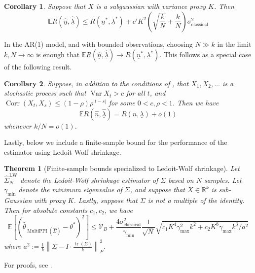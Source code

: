 \documentclass{article} %
\newcommand{\R}{\mathbb{R}}
\newcommand{\Ex}{\mathbb{E}}
\DeclareMathOperator{\Var}{Var}
\DeclareMathOperator{\multiPPI}{MultiPPI}
\DeclareMathOperator{\Corr}{Corr}
\DeclareMathOperator{\tr}{tr}
\newtheorem{theorem}{Theorem}
\newtheorem{corollary}[corollary]{Corollary}
\newcommand{\wh}[1]{\widehat{#1}}
\newcommand{\ul}[1]{\underline{#1}}
\DeclareMathOperator{\classical}{classical}
\begin{document}
\begin{corollary}\label{cor:subg}
    Suppose that $X$ is a subgaussian with variance proxy $K$. Then
    \[
    \Ex R(\wh{\ul{n}},\wh{\ul{\lambda}})\leq R(\ul{n}^*,\ul{\lambda}^*)+c' K^2\left(\sqrt{\frac{k}{N}}+\frac{k}{N}\right)\sigma^2_{\classical}
    \]
\end{corollary}

In the AR(1) model, and with bounded observations, choosing $N\gg k$ in the limit $k,N\to\infty$ is enough that $\mathbb{E}R(\wh{\ul{n}},\wh{\ul{\lambda}}) \to R({\ul{n}}^*,{\ul{\lambda}}^*)$. This follows as a special case of the following result.

\begin{corollary}\label{cor:gersch}
Suppose, in addition to the conditions of , that $X_1,X_2,\dots$ is a stochastic process such that $\Var X_t>c$ for all $t$, and $\Corr(X_t,X_s)\leq (1-\rho)\rho^{|t-s|}$ for some $0<c,\rho<1$. Then we have
\[
\Ex R(\wh{\ul{n}},\wh{\ul{\lambda}}) = R(\ul{n},\ul{\lambda}) +o(1)
\]
whenever $k/N = o(1)$.
\end{corollary}

Lastly, below we include a finite-sample bound for the performance of the estimator using Ledoit-Wolf shrinkage.
\begin{theorem}[Finite-sample bounds specialized to Ledoit-Wolf shrinkage]\label{thm:ledoit}
    Let $\widehat{\Sigma}_N^
    \text{LW}$ denote the Ledoit-Wolf shrinkage estimator of $\Sigma$ based on $N$ samples. Let $\gamma_{\min}$ denote the minimum eigenvalue of $\Sigma$, and suppose that $X\in \R^k$ is sub-Gaussian with proxy $K$. Lastly, suppose that $\Sigma$ is not a multiple of the identity. Then for absolute constants $c_1,c_2$, we have
    \[
    \Ex \left[\left(\hat{\theta}_{\multiPPI(\wh{\Sigma})}-\theta^*\right)^2\right] \leq \mathcal{V}_B+\frac{4\sigma^2_{\text{classical}}}{\gamma_{\min}} \frac{1}{\sqrt{N}}\sqrt{c_1K^4\gamma_{\max}^2 k^2 + c_2 K^8 \gamma_{\max} k^3/a^2}
    \]
    where $a^2:=\frac{1}{k}\left\|\Sigma - I\cdot \frac{\tr(\Sigma)}{k}\right\|_F^2$.
\end{theorem}
For proofs, see .
\end{document}
